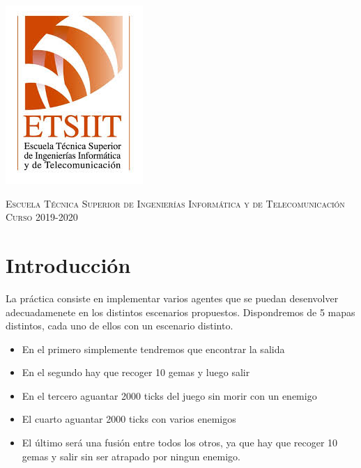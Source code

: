 \documentclass[11pt,a4paper]{article}
\begin{document}
\begin{titlepage}
\begin{minipage}{\textwidth}
\includegraphics[scale=0.3]{img/etsiit.jpeg}

\vspace{0.7cm}
\textsc{Escuela Técnica Superior de Ingenierías Informática y de Telecomunicación}\\
\vspace{1cm}
\textsc{Curso 2019-2020}
\end{minipage}
\end{titlepage}

\tableofcontents
\thispagestyle{empty}				%

\newpage

\setlength{\parskip}{1em}


\section{Introducción}

La práctica consiste en implementar varios agentes que se puedan desenvolver adecuadamenete en los
distintos escenarios propuestos. Dispondremos de 5 mapas distintos, cada uno de ellos con un escenario
distinto.

\begin{itemize}
    \item En el primero simplemente tendremos que encontrar la salida
    \item En el segundo hay que recoger 10 gemas y luego salir
    \item En el tercero aguantar 2000 ticks del juego sin morir con un enemigo
    \item El cuarto aguantar 2000 ticks con varios enemigos
    \item El último será una fusión entre todos los otros, ya que hay que recoger 10 gemas y salir sin
          ser atrapado por ningun enemigo.
\end{itemize}
\end{document}
